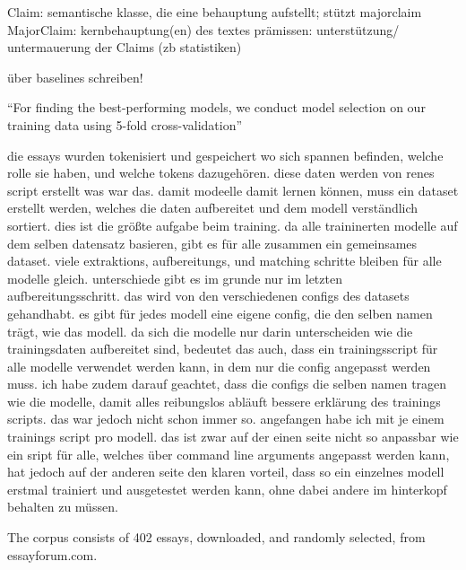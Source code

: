 \documentclass[12]{article}
\theoremstyle{mytheoremstyle}
\theoremstyle{mytheoremstyle}
\theoremstyle{myproblemstyle}
\begin{document}
  Claim: semantische klasse, die eine behauptung aufstellt; stützt majorclaim 
  MajorClaim: kernbehauptung(en) des textes 
  prämissen: unterstützung/ untermauerung der Claims (zb statistiken) 

  über baselines schreiben!

  ``For finding the best-performing models, we conduct model selection on our training data using 5-fold cross-validation''


  die essays wurden tokenisiert und gespeichert wo sich spannen befinden, welche rolle sie haben, und welche tokens dazugehören. diese daten werden von renes script erstellt was war das. damit modeelle damit lernen können, muss ein dataset erstellt werden, welches die daten aufbereitet und dem modell verständlich sortiert. dies ist die größte aufgabe beim training. da alle traininerten modelle auf dem selben datensatz basieren, gibt es für alle zusammen ein gemeinsames dataset. viele extraktions, aufbereitungs, und matching schritte bleiben für alle modelle gleich. unterschiede gibt es im grunde nur im letzten aufbereitungsschritt. das wird von den verschiedenen configs des datasets gehandhabt. es gibt für jedes modell eine eigene config, die den selben namen trägt, wie das modell. da sich die modelle nur darin unterscheiden wie die trainingsdaten aufbereitet sind, bedeutet das auch, dass ein trainingsscript für alle modelle verwendet werden kann, in dem nur die config angepasst werden muss. ich habe zudem darauf geachtet, dass die configs die selben namen tragen wie die modelle, damit alles reibungslos abläuft bessere erklärung des trainings scripts. das war jedoch nicht schon immer so. angefangen habe ich mit je einem trainings script pro modell. das ist zwar auf der einen seite nicht so anpassbar wie ein sript für alle, welches über command line arguments angepasst werden kann, hat jedoch auf der anderen seite den klaren vorteil, dass so ein einzelnes modell erstmal trainiert und ausgetestet werden kann, ohne dabei andere im hinterkopf behalten zu müssen. 

The corpus consists of 402 essays, downloaded, and randomly selected, from essayforum.com. 
\end{document}
